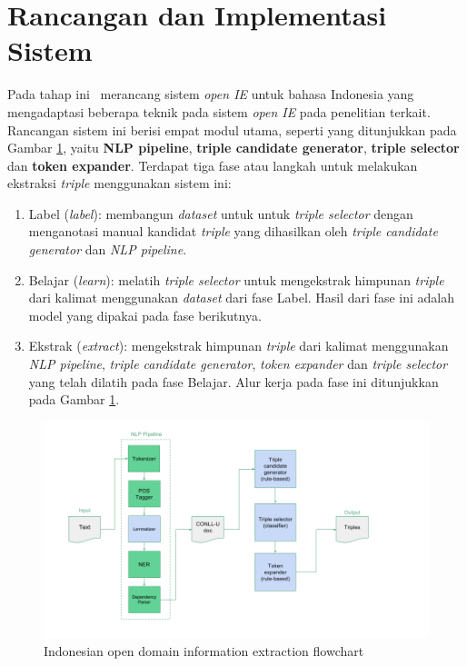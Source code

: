 \section{Rancangan dan Implementasi Sistem}

Pada tahap ini \saya~merancang sistem \textit{open IE} untuk bahasa Indonesia yang mengadaptasi beberapa teknik pada sistem \textit{open IE} pada penelitian terkait. Rancangan sistem ini berisi empat modul utama, seperti yang ditunjukkan pada Gambar \ref{fig:program_flowchart}, yaitu \textbf{NLP pipeline}, \textbf{triple candidate generator}, \textbf{triple selector} dan \textbf{token expander}. Terdapat tiga fase atau langkah untuk melakukan ekstraksi \textit{triple} menggunakan sistem ini:

\begin{enumerate}
	\item Label (\textit{label}): membangun \textit{dataset} untuk untuk \textit{triple selector} dengan menganotasi manual kandidat \textit{triple} yang dihasilkan oleh \textit{triple candidate generator} dan \textit{NLP pipeline}.  
	\item Belajar (\textit{learn}): melatih \textit{triple selector} untuk mengekstrak himpunan \textit{triple} dari kalimat menggunakan \textit{dataset} dari fase Label. Hasil dari fase ini adalah model yang dipakai pada fase berikutnya.
	\item Ekstrak (\textit{extract}): mengekstrak himpunan \textit{triple} dari kalimat menggunakan \textit{NLP pipeline}, \textit{triple candidate generator}, \textit{token expander} dan \textit{triple selector} yang telah dilatih pada fase Belajar. Alur kerja pada fase ini ditunjukkan pada Gambar \ref{fig:program_flowchart}.
\end{enumerate}



\begin{figure}
\centering
\includegraphics[width=\textwidth]{../images/program_flowchart.png}
\caption{Indonesian open domain information extraction flowchart}
\label{fig:program_flowchart}
\end{figure}

